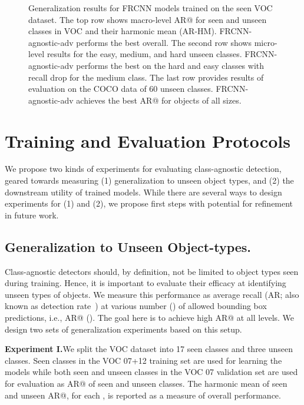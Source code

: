 \documentclass[10pt,twocolumn,letterpaper]{article}
\begin{document}
{\begin{figure*}
\begin{subfigure}{\fs\textwidth}
\begin{tabular}{c c}
\bottomrule
\end{tabular}
\end{subfigure}
\caption{Generalization results for FRCNN models trained on the seen VOC dataset. The top row shows macro-level AR@ for seen and unseen classes in VOC and their harmonic mean (AR-HM). FRCNN-agnostic-adv performs the best overall. The second row shows micro-level results for the easy, medium, and hard unseen classes. FRCNN-agnostic-adv performs the best on the hard and easy classes with recall drop for the medium class. The last row provides results of evaluation on the COCO data of 60 unseen classes. FRCNN-agnostic-adv achieves the best AR@ for objects of all sizes.}
\label{fig:frcnn_voc}
\vspace{-7pt}
\end{figure*}
} \section{Training and Evaluation Protocols}
\label{sec:protocols}

We propose two kinds of experiments for evaluating class-agnostic detection, geared towards measuring (1) generalization to unseen object types, and (2) the downstream utility of trained models. While there are several ways to design experiments for (1) and (2), we propose first steps with potential for refinement in future work.

\subsection{Generalization to Unseen Object-types.}
\label{subsec:gen}

Class-agnostic detectors should, by definition, not be limited to object types seen during training. Hence, it is important to evaluate their efficacy at identifying unseen types of objects. We measure this performance as average recall (AR; also known as detection rate~\cite{bib:edge_proposal_3_edgeboxes}) at various number () of allowed bounding box predictions, i.e., AR@ (). The goal here is to achieve high AR@ at all  levels. We design two sets of generalization experiments based on this setup.

\vspace{3pt}
\noindent\textbf{Experiment I.}\quad We split the VOC dataset into 17 seen classes and three unseen classes. Seen classes in the VOC 07+12 training set are used for learning the models while both seen and unseen classes in the VOC 07 validation set are used for evaluation as AR@ of seen and unseen classes. The harmonic mean of seen and unseen AR@, for each , is reported as a measure of overall performance.
\end{document}
